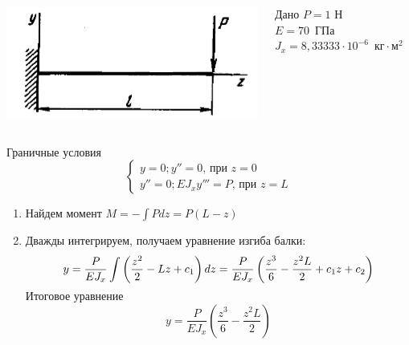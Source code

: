 \documentclass[ignoreonframetext,unicode]{beamer}
\begin{document}
	\begin{frame}{}
	
	\begin{columns}
		\includegraphics[width=\textwidth]{pic.7}
		\vspace*{-2.0mm}
		\begin{block}{Дано}
			$P = 1$ Н \\ 
			$E = 70$~ГПа\\
			$J_{x} = 8,33333 \cdot 10^{-6}$~$\mbox{кг} \cdot \mbox{м}^2$
		\end{block}
	\end{columns}
	\vspace*{-2.0mm}
	\begin{block}{Граничные условия}\vspace*{-1.0mm}
	\[
	\begin{cases}
			y = 0; y'' = 0\mbox{, при } z = 0\\
			y'' = 0; E J_{x} y''' = P\mbox{, при } z = L
	\end{cases}
	\]		
	\end{block}

		\begin{enumerate}
		\item Найдем момент $M = -\int P d z = P(L - z)$
		
		\item Дважды интегрируем, получаем уравнение изгиба балки:
		\vspace*{-2.0mm}
		\begin{gather*}\vspace*{-2.0mm}
			y = \frac{P}{E J_{x}} \int \left(\frac{z^2}{2} - L z + c_1\right) d z = \frac{P}{E J_{x}} \left(\frac{z^3}{6} - \frac{z^2 L}{2} + c_1 z + c_2\right)
		\end{gather*}
		\vspace*{-3.0mm}
		\begin{block}{Итоговое уравнение}\vspace*{-1.0mm}
			\[
			y = \frac{P}{E J_{x}} \left(\frac{z^3}{6} - \frac{z^2 L}{2}\right)
			\]
		\end{block}
		
	\end{enumerate}
	
	\end{frame}
\end{document}
